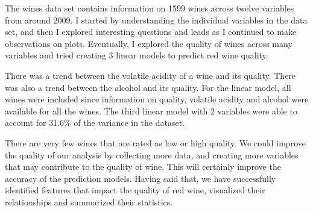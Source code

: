 \documentclass[]{article}
\begin{document}
The wines data set contains information on 1599 wines across twelve
variables from around 2009. I started by understanding the individual
variables in the data set, and then I explored interesting questions and
leads as I continued to make observations on plots. Eventually, I
explored the quality of wines across many variables and tried creating 3
linear models to predict red wine quality.

There was a trend between the volatile acidity of a wine and its
quality. There was also a trend between the alcohol and its quality. For
the linear model, all wines were included since information on quality,
volatile acidity and alcohol were available for all the wines. The third
linear model with 2 variables were able to account for 31.6\% of the
variance in the dataset.

There are very few wines that are rated as low or high quality. We could
improve the quality of our analysis by collecting more data, and
creating more variables that may contribute to the quality of wine. This
will certainly improve the accuracy of the prediction models. Having
said that, we have successfully identified features that impact the
quality of red wine, visualized their relationships and summarized their
statistics.
\end{document}
